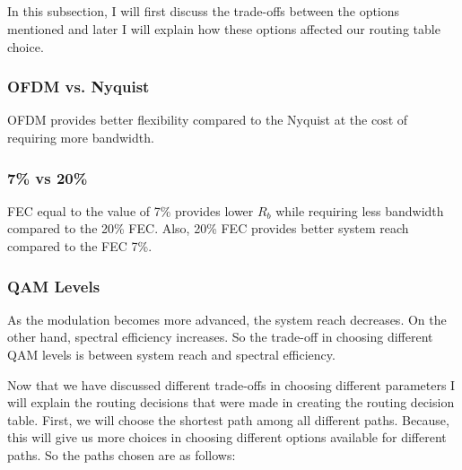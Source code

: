\documentclass{article}
\begin{document}
\subsection{}

In this subsection, I will first discuss the trade-offs between the options mentioned and later I will explain how these options affected our routing table choice.

\subsubsection{OFDM vs. Nyquist}
OFDM provides better flexibility compared to the Nyquist at the cost of requiring more bandwidth.

\subsubsection{7\% vs 20\%}
FEC equal to the value of 7\% provides lower $R_b$ while requiring less bandwidth compared to the 20\% FEC. Also, 20\% FEC provides better system reach compared to the FEC 7\%.

\subsubsection{QAM Levels}
As the modulation becomes more advanced, the system reach decreases. On the other hand, spectral efficiency increases. So the trade-off in choosing different QAM levels is between system reach and spectral efficiency.

Now that we have discussed different trade-offs in choosing different parameters I will explain the routing decisions that were made in creating the routing decision table. First, we will choose the shortest path among all different paths. Because, this will give us more choices in choosing different options available for different paths. So the paths chosen are as follows:
\end{document}
